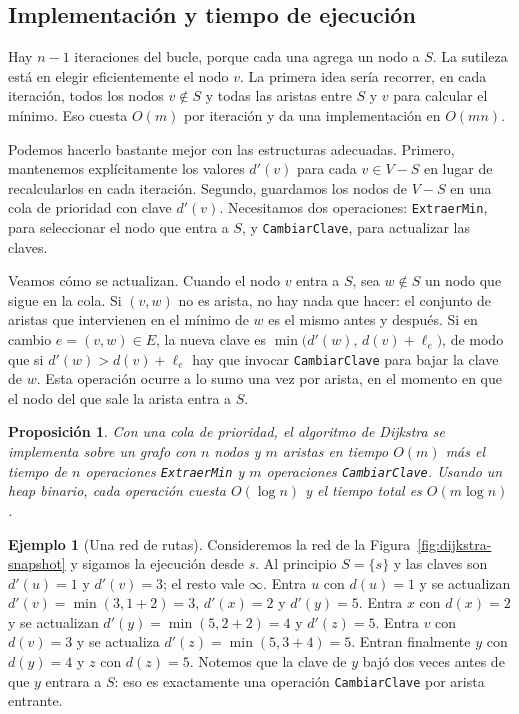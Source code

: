\documentclass[12pt, spanish, oneside, openany]{book}
\theoremstyle{uprightplain}
\newtheorem{proposicion}[teorema]{Proposición}
\theoremstyle{definition}
\newtheorem{ejemplo}[teorema]{Ejemplo}
\theoremstyle{remark}
\theoremstyle{definition}
\begin{document}
\subsection{Implementación y tiempo de ejecución}

Hay $n-1$ iteraciones del bucle, porque cada una agrega un nodo a $S$. La sutileza está en elegir eficientemente el nodo $v$. La primera idea sería recorrer, en cada iteración, todos los nodos $v \notin S$ y todas las aristas entre $S$ y $v$ para calcular el mínimo. Eso cuesta $O(m)$ por iteración y da una implementación en $O(mn)$.

Podemos hacerlo bastante mejor con las estructuras adecuadas. Primero, mantenemos explícitamente los valores $d'(v)$ para cada $v \in V-S$ en lugar de recalcularlos en cada iteración. Segundo, guardamos los nodos de $V-S$ en una cola de prioridad con clave $d'(v)$. Necesitamos dos operaciones: \texttt{ExtraerMin}, para seleccionar el nodo que entra a $S$, y \texttt{CambiarClave}, para actualizar las claves.

Veamos cómo se actualizan. Cuando el nodo $v$ entra a $S$, sea $w \notin S$ un nodo que sigue en la cola. Si $(v,w)$ no es arista, no hay nada que hacer: el conjunto de aristas que intervienen en el mínimo de $w$ es el mismo antes y después. Si en cambio $e=(v,w) \in E$, la nueva clave es $\min\bigl(d'(w),\,d(v)+\ell_e\bigr)$, de modo que si $d'(w)>d(v)+\ell_e$ hay que invocar \texttt{CambiarClave} para bajar la clave de $w$. Esta operación ocurre a lo sumo una vez por arista, en el momento en que el nodo del que sale la arista entra a $S$.

\begin{proposicion}
\label{prop:dijkstra-tiempo}
Con una cola de prioridad, el algoritmo de Dijkstra se implementa sobre un grafo con $n$ nodos y $m$ aristas en tiempo $O(m)$ más el tiempo de $n$ operaciones \texttt{ExtraerMin} y $m$ operaciones \texttt{CambiarClave}. Usando un heap binario, cada operación cuesta $O(\log n)$ y el tiempo total es $O(m\log n)$.
\end{proposicion}

\begin{ejemplo}[Una red de rutas]
\label{ej:dijkstra-rutas}
Consideremos la red de la Figura~\ref{fig:dijkstra-snapshot} y sigamos la ejecución desde $s$. Al principio $S=\{s\}$ y las claves son $d'(u)=1$ y $d'(v)=3$; el resto vale $\infty$. Entra $u$ con $d(u)=1$ y se actualizan $d'(v)=\min(3,1+2)=3$, $d'(x)=2$ y $d'(y)=5$. Entra $x$ con $d(x)=2$ y se actualizan $d'(y)=\min(5,2+2)=4$ y $d'(z)=5$. Entra $v$ con $d(v)=3$ y se actualiza $d'(z)=\min(5,3+4)=5$. Entran finalmente $y$ con $d(y)=4$ y $z$ con $d(z)=5$. Notemos que la clave de $y$ bajó dos veces antes de que $y$ entrara a $S$: eso es exactamente una operación \texttt{CambiarClave} por arista entrante.
\end{ejemplo}
\end{document}

